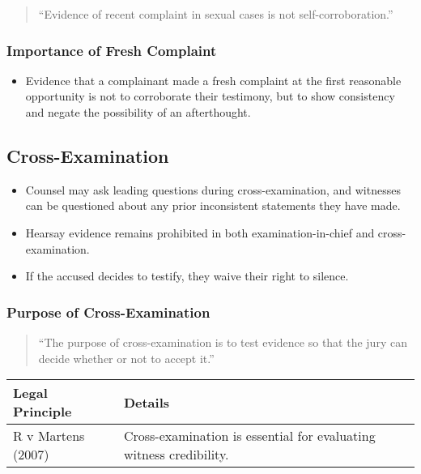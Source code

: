 \begin{quote}
``Evidence of recent complaint in sexual cases is not
self-corroboration.''
\end{quote}

\subsubsection{Importance of Fresh
Complaint}\label{importance-of-fresh-complaint}

\begin{itemize}
\tightlist
\item
  Evidence that a complainant made a fresh complaint at the first
  reasonable opportunity is not to corroborate their testimony, but to
  show consistency and negate the possibility of an afterthought.
\end{itemize}

\subsection{  Cross-Examination}\label{cross-examination}

\begin{itemize}
\tightlist
\item
  Counsel may ask leading questions during cross-examination, and
  witnesses can be questioned about any prior inconsistent statements
  they have made.
\item
  Hearsay evidence remains prohibited in both examination-in-chief and
  cross-examination.
\item
  If the accused decides to testify, they waive their right to silence.
\end{itemize}

\subsubsection{Purpose of
Cross-Examination}\label{purpose-of-cross-examination}

\begin{quote}
``The purpose of cross-examination is to test evidence so that the jury
can decide whether or not to accept it.''
\end{quote}

\begin{longtable}[]{@{}
  >{\raggedright\arraybackslash}p{}
  >{\raggedright\arraybackslash}p{}@{}}
\toprule\noalign{}
\begin{minipage}[b]{\linewidth}\raggedright
\textbf{Legal Principle}
\end{minipage} & \begin{minipage}[b]{\linewidth}\raggedright
\textbf{Details}
\end{minipage} \\
\midrule\noalign{}
\endhead
\bottomrule\noalign{}
\endlastfoot
R v Martens (2007) & Cross-examination is essential for evaluating
witness credibility. \\
\end{longtable}

